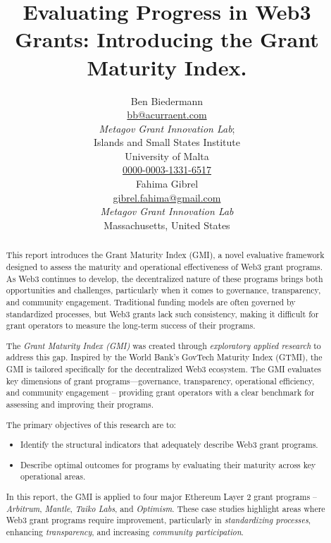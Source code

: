 \documentclass[a4,10pt]{article}
\title{Evaluating Progress in Web3 Grants: Introducing the Grant Maturity Index.}
\author{
Ben Biedermann\\
\href{mailto:bb@acurraent.com}{bb@acurraent.com}\\
\textit{Metagov Grant Innovation Lab};\\
Islands and Small States Institute \\
University of Malta\\
\href{https://orcid.org/0000-0003-1331-6517}{0000-0003-1331-6517}\\
\And
Fahima Gibrel\\
\href{mailto:mgibrel.fahima@gmail.com}{gibrel.fahima@gmail.com}\\
\textit{Metagov Grant Innovation Lab}\\
Massachusetts, United States  \\
}
\begin{document}
 
 

\vfill

 \pagestyle{plain}
\maketitle

\begin{abstract}
This report introduces the Grant Maturity Index (GMI), a novel evaluative framework designed to assess the maturity and operational effectiveness of Web3 grant programs. As Web3 continues to develop, the decentralized nature of these programs brings both opportunities and challenges, particularly when it comes to governance, transparency, and community engagement. Traditional funding models are often governed by standardized processes, but Web3 grants lack such consistency, making it difficult for grant operators to measure the long-term success of their programs.

The \textit{Grant Maturity Index (GMI)} was created through \textit{exploratory applied research} to address this gap. Inspired by the World Bank’s GovTech Maturity Index (GTMI), the GMI is tailored specifically for the decentralized Web3 ecosystem. The GMI evaluates key dimensions of grant programs—governance, transparency, operational efficiency, and community engagement -- providing grant operators with a clear benchmark for assessing and improving their programs.

The primary objectives of this research are to:
\begin{itemize}
    \item Identify the structural indicators that adequately describe Web3 grant programs.
    \item Describe optimal outcomes for programs by evaluating their maturity across key operational areas.
\end{itemize}

In this report, the GMI is applied to four major Ethereum Layer 2 grant programs -- \textit{Arbitrum}, \textit{Mantle}, \textit{Taiko Labs}, and \textit{Optimism}. These case studies highlight areas where Web3 grant programs require improvement, particularly in \textit{standardizing processes}, enhancing \textit{transparency}, and increasing \textit{community participation}.

\end{abstract}
\end{document}
